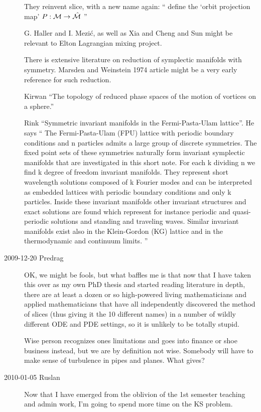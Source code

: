 \begin{description}
They reinvent slice, with a new name again:
``
define the `orbit projection map'
$P: {\cal M} \to \hat{\cal M} $
''

G. Haller and I. Mezi\'c, as well as Xia
and Cheng and Sun might be relevant to Elton
Lagrangian mixing project.

There is extensive literature on reduction of symplectic manifolds with
symmetry.
Marsden and Weinstein 1974 article
might be a very early reference for such reduction.

Kirwan ``The topology of reduced phase spaces of
the motion of vortices on a sphere.''

 Rink
``Symmetric invariant manifolds in
  the  {Fermi-Pasta-Ulam} lattice''. He says ``
The Fermi-Pasta-Ulam (FPU) lattice with periodic boundary
conditions and n particles admits a large group of discrete
symmetries. The fixed point sets of these symmetries naturally
form invariant symplectic manifolds that are investigated in
this short note. For each k dividing n we find k degree of
freedom invariant manifolds. They represent short wavelength
solutions composed of k Fourier modes and can be interpreted as
embedded lattices with periodic boundary conditions and only k
particles. Inside these invariant manifolds other invariant
structures and exact solutions are found which represent for
instance periodic and quasi-periodic solutions and standing and
traveling waves. Similar invariant manifolds exist also in the
Klein-Gordon (KG) lattice and in the thermodynamic and
continuum limits.
''

\item[2009-12-20 Predrag]
	OK, we might be fools, but what baffles me is that now
that I have taken this over as my own PhD thesis and started
reading literature in depth, there are at least a dozen or so
high-powered living mathematicians and applied mathematicians
that have all independently discovered the method of slices
(thus giving it the 10 different names) in a number of wildly
different ODE and PDE settings, so it is unlikely to be
totally stupid.

Wise person recognizes ones limitations and goes into finance
or shoe business instead, but we are by definition not wise.
Somebody will have to make sense of turbulence in pipes and
planes. What gives?

\item[2010-01-05 Ruslan] Now that I have emerged from the
oblivion of the 1st semester teaching and admin work, I'm
going to spend more time on the KS problem.


\end{description}
